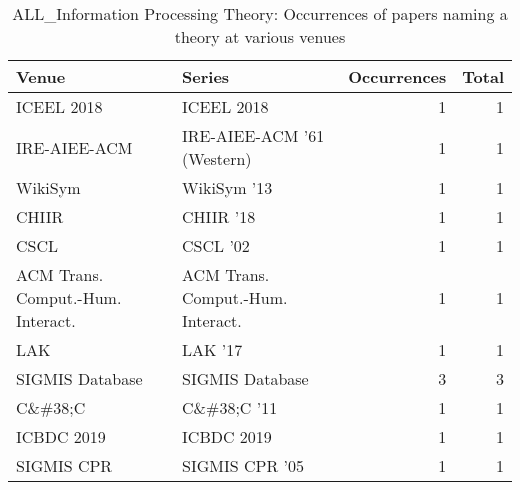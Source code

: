 \begin{table*}[t]
\begin{tabular}{llrr}
Venue & Series & Occurrences & Total\\\hline
\multirow{1}{*}{ICEEL 2018} & ICEEL 2018 & 1 & \multirow{1}{*}{1}\\
\multirow{1}{*}{IRE-AIEE-ACM } & IRE-AIEE-ACM '61 (Western) & 1 & \multirow{1}{*}{1}\\
\multirow{1}{*}{WikiSym } & WikiSym '13 & 1 & \multirow{1}{*}{1}\\
\multirow{1}{*}{CHIIR } & CHIIR '18 & 1 & \multirow{1}{*}{1}\\
\multirow{1}{*}{CSCL } & CSCL '02 & 1 & \multirow{1}{*}{1}\\
\multirow{1}{*}{ACM Trans. Comput.-Hum. Interact.} & ACM Trans. Comput.-Hum. Interact. & 1 & \multirow{1}{*}{1}\\
\multirow{1}{*}{LAK } & LAK '17 & 1 & \multirow{1}{*}{1}\\
\multirow{1}{*}{SIGMIS Database} & SIGMIS Database & 3 & \multirow{1}{*}{3}\\
\multirow{1}{*}{C\&\#38;C } & C\&\#38;C '11 & 1 & \multirow{1}{*}{1}\\
\multirow{1}{*}{ICBDC 2019} & ICBDC 2019 & 1 & \multirow{1}{*}{1}\\
\multirow{1}{*}{SIGMIS CPR } & SIGMIS CPR '05 & 1 & \multirow{1}{*}{1}\\
\end{tabular}
\caption{ALL\_Information Processing Theory: Occurrences of papers naming a theory at various venues}
\end{table*}